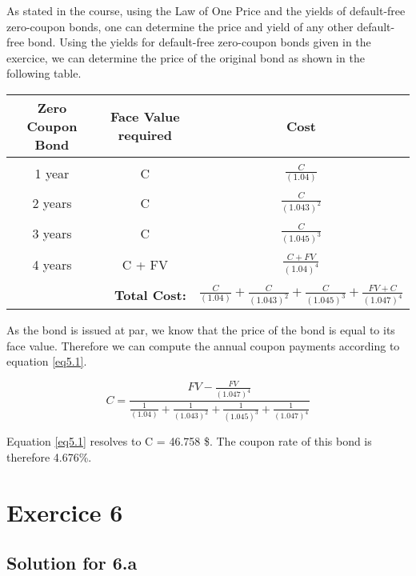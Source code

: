 \documentclass[a4paper,11pt,twoside]{article}
\begin{document}
As stated in the course, using the Law of One Price and the yields of default-free zero-coupon bonds, one can determine the price and yield of any other default-free bond. Using the yields for default-free zero-coupon bonds given in the exercice, we can determine the price of the original bond as shown in the following table. 

\begin{center}
\begin{tabular} { c  c  c }
\textbf{Zero Coupon Bond} & \textbf{Face Value required} & \textbf{Cost} \\
 \hline \\[-7pt]
1 year & C & $\frac{C}{(1.04)}$ \\[5pt]
\hline \\[-7pt]
2 years & C & $\frac{C}{(1.043)^2}$ \\[5pt]
\hline \\[-7pt]
3 years & C & $\frac{C}{(1.045)^3}$ \\[5pt]
\hline \\[-7pt]
4 years & C + FV & $\frac{C+FV}{(1.04)^4}$ \\[5pt]
\hline
\hline \\[-7pt]
\multicolumn{2}{r}{\textbf{Total Cost:}} & $ \frac{C}{(1.04)} + \frac{C}{(1.043)^2} + \frac{C}{(1.045)^3} + \frac{FV+C}{(1.047)^4} $ \\
\end{tabular}
\end{center}

As the bond is issued at par, we know that the price of the bond is equal to its face value. Therefore we can compute the annual coupon payments according to equation \ref{eq5.1}. 

\begin{equation}
\label{eq5.1}
C = \frac{FV - \frac{FV}{(1.047)^4}}{\frac{1}{(1.04)} + \frac{1}{(1.043)^2} + \frac{1}{(1.045)^3} + \frac{1}{(1.047)^4}}
\end{equation}

Equation \ref{eq5.1} resolves to C = 46.758 \$. The coupon rate of this bond is therefore 4.676\%.

\section{Exercice 6}

\subsection{Solution for 6.a}
\end{document}
